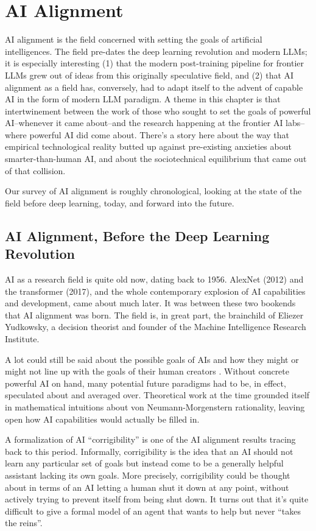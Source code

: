 \chapter{AI Alignment}\label{ch_ai_alignment}

AI alignment is the field concerned with setting the goals of artificial
intelligences. The field pre-dates the deep learning revolution and modern
LLMs; it is especially interesting (1) that the modern post-training pipeline
for frontier LLMs grew out of ideas from this originally speculative field, and
(2) that AI alignment as a field has, conversely, had to adapt itself to the
advent of capable AI in the form of modern LLM paradigm. A theme in this
chapter is that intertwinement between the work of those who sought to set the
goals of powerful AI--whenever it came about--and the research happening at the
frontier AI labs--where powerful AI did come about. There's a story here about
the way that empirical technological reality butted up against pre-existing
anxieties about smarter-than-human AI, and about the sociotechnical equilibrium
that came out of that collision.

Our survey of AI alignment is roughly chronological, looking at the state of
the field before deep learning, today, and forward into the future.

\section{AI Alignment, Before the Deep Learning Revolution}
AI as a research field is quite old now, dating back to 1956. AlexNet (2012)
and the transformer (2017), and the whole contemporary explosion of AI
capabilities and development, came about much later. It was between these two
bookends that AI alignment was born. The field is, in great part, the
brainchild of Eliezer Yudkowsky, a decision theorist and founder of the Machine
Intelligence Research Institute.

A lot could still be said about the possible goals of AIs and how they might or
might not line up with the goals of their human creators
\cite{bostrom2014superintelligence}. Without concrete powerful AI on hand, many
potential future paradigms had to be, in effect, speculated about and averaged
over. Theoretical work at the time grounded itself in mathematical intuitions
about von Neumann-Morgenstern rationality, leaving open how AI capabilities
would actually be filled in.

A formalization of AI ``corrigibility'' is one of the AI alignment results
tracing back to this period. Informally, corrigibility is the idea that an AI
should not learn any particular set of goals but instead come to be a generally
helpful assistant lacking its own goals. More precisely, corrigibility could be
thought about in terms of an AI letting a human shut it down at any point,
without actively trying to prevent itself from being shut down. It turns out
that it's quite difficult to give a formal model of an agent that wants to help
but never ``takes the reins''.

